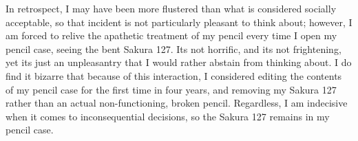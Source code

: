 \documentclass[12pt]{article}
\begin{document}
In retrospect, I may have been more flustered than what is considered socially acceptable, so that incident is not particularly pleasant to think about; however, I am forced to relive the apathetic treatment of my pencil every time I open my pencil case, seeing the bent Sakura 127. Its not horrific, and its not frightening, yet its just an unpleasantry that I would rather abstain from thinking about. I do find it bizarre that because of this interaction, I considered editing the contents of my pencil case for the first time in four years, and removing my Sakura 127 rather than an actual non-functioning, broken pencil. Regardless, I am indecisive when it comes to inconsequential decisions, so the Sakura 127 remains in my pencil case.
\end{document}
